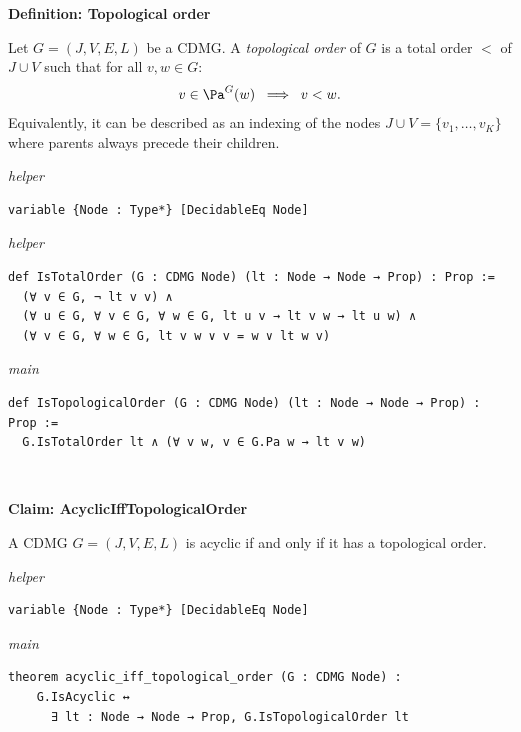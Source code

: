 \vspace{\appendixNotesGap}

\noindent\textbf{Definition: Topological order}\par\smallskip
{\appendixTexSize
    Let $G=(J,V,E,L)$ be a CDMG.
    A \emph{topological order} of $G$ is a total order $<$ of $J \cup V$ such that for all $v,w \in G$:
    \[ v \in \Pa^G(w) \; \implies \; v < w.\]
    Equivalently, it can be described as an indexing of the nodes $J \cup V = \{v_1,\dots,v_K\}$ where parents always precede their children.
\par}
\smallskip
{\small\textit{helper}}
\begin{verbatim}
variable {Node : Type*} [DecidableEq Node]
\end{verbatim}
{\small\textit{helper}}
\begin{verbatim}
def IsTotalOrder (G : CDMG Node) (lt : Node → Node → Prop) : Prop :=
  (∀ v ∈ G, ¬ lt v v) ∧
  (∀ u ∈ G, ∀ v ∈ G, ∀ w ∈ G, lt u v → lt v w → lt u w) ∧
  (∀ v ∈ G, ∀ w ∈ G, lt v w ∨ v = w ∨ lt w v)
\end{verbatim}
{\small\textit{main}}
\begin{verbatim}
def IsTopologicalOrder (G : CDMG Node) (lt : Node → Node → Prop) : Prop :=
  G.IsTotalOrder lt ∧ (∀ v w, v ∈ G.Pa w → lt v w)
\end{verbatim}
~%

\vspace{\appendixNotesGap}

\noindent\textbf{Claim: AcyclicIffTopologicalOrder}\par\smallskip
{\appendixTexSize
        A CDMG  $G=(J,V,E,L)$ is acyclic if and only if it has a topological order.
\par}
\smallskip
{\small\textit{helper}}
\begin{verbatim}
variable {Node : Type*} [DecidableEq Node]
\end{verbatim}
{\small\textit{main}}
\begin{verbatim}
theorem acyclic_iff_topological_order (G : CDMG Node) :
    G.IsAcyclic ↔
      ∃ lt : Node → Node → Prop, G.IsTopologicalOrder lt
\end{verbatim}
~%

